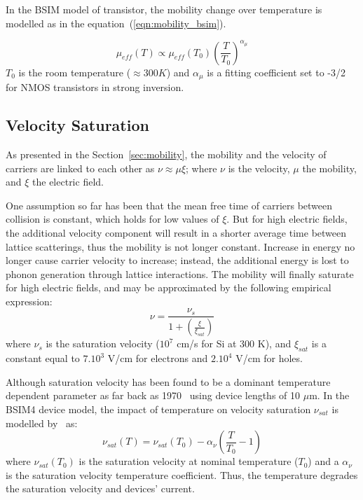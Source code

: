 In the BSIM model of transistor, the mobility change over temperature is modelled as in the equation~(\ref{eqn:mobility_bsim}).

\begin{equation}
\label{eqn:mobility_bsim}
\mu_{eff}(T) \varpropto \mu_{eff}(T_0) {\left(\frac{T}{T_0} \right)}^{\alpha_\mu}
\end{equation}
\(T_0 \) is the room temperature (\(\approx 300 K \)) and \(\alpha_\mu \) is a fitting coefficient set to -3/2 for NMOS transistors in strong inversion.

\subsection{Velocity Saturation}    %
As presented in the Section~\ref{sec:mobility}, the mobility and the velocity of carriers are linked to each other as \(\nu \approx \mu \xi \); where \(\nu \) is the velocity, \(\mu \) the mobility, and \(\xi \) the electric field.

One assumption so far has been that the mean free time of carriers between collision is constant, which holds for low values of \(\xi \). But for high electric fields, the additional velocity component will result in a shorter average time between lattice scatterings, thus the mobility is not longer constant. Increase in energy no longer cause carrier velocity to increase; instead, the additional energy is lost to phonon generation through lattice interactions. The mobility will finally saturate for high electric fields, and may be approximated by the following empirical expression: 
\begin{equation}
\label{eqn:vsat}
    \nu = \frac{\nu_s}{1 + \left(\frac{\xi}{\xi_{sat}}\right)}
\end{equation}
where \(\nu_s \) is the saturation velocity (\(10^7 \) cm/s for Si at 300 K), and \(\xi_{sat}\) is a constant equal to \(7.10^3 \) V/cm for electrons and \(2.10^4 \) V/cm for holes.

Although saturation velocity has been found to be a dominant temperature dependent parameter as far back as 1970~\cite{Fowler1970} using device lengths of 10 \(\mu \)m. In the BSIM4 device model, the impact of temperature on velocity saturation \(\nu_{sat} \) is modelled by~\cite{Cheng1997} as:
\begin{equation}
\label{eqn:vsat_T}
    \nu_{sat}(T) = \nu_{sat}(T_0) - \alpha_\nu \left(\frac{T}{T_0}-1\right)
\end{equation}
where \(\nu_{sat}(T_0)\) is the saturation velocity at nominal temperature (\(T_0 \)) and a \(\alpha_\nu \) is the saturation velocity temperature coefficient. Thus, the temperature degrades the saturation velocity and devices' current.

